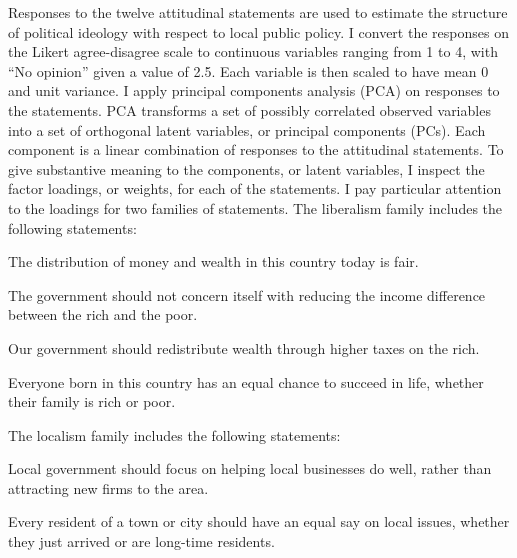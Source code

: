 \documentclass[article,12pt]{memoir}
\begin{document}
Responses to the twelve attitudinal statements are used to estimate the structure of political ideology with respect to local public policy.  I convert the responses on the Likert agree-disagree scale to continuous variables ranging from 1 to 4, with ``No opinion'' given a value of 2.5.  Each variable is then scaled to have mean 0 and unit variance.  I  apply principal components analysis (PCA) on responses to the statements. PCA transforms a set of possibly correlated observed variables into a set of orthogonal latent variables, or principal components (PCs).  Each component is a linear combination of responses to the attitudinal statements. To give substantive meaning to the components, or latent variables, I inspect the factor loadings, or weights, for each of the statements.  I pay particular attention to the loadings for two families of statements.  The liberalism family includes the following statements:
  \begin{itemize}\begin{SingleSpace}
    \item The distribution of money and wealth in this country today is fair.
    \item The government should not concern itself with reducing the income difference between the rich and the poor.
    \item Our government should redistribute wealth through higher taxes on the rich.
    \item Everyone born in this country has an equal chance to succeed in life, whether their family is rich or poor.
  \end{SingleSpace}\end{itemize}

\vspace{1em}The localism family includes the following statements:
  \begin{itemize}
    \begin{SingleSpace}
    \item Local government should focus on helping local businesses do well, rather than attracting new firms to the area.
    \item Every resident of a town or city should have an equal say on local issues, whether they just arrived or are long-time residents.\end{SingleSpace}
  \end{itemize}
\end{document}
